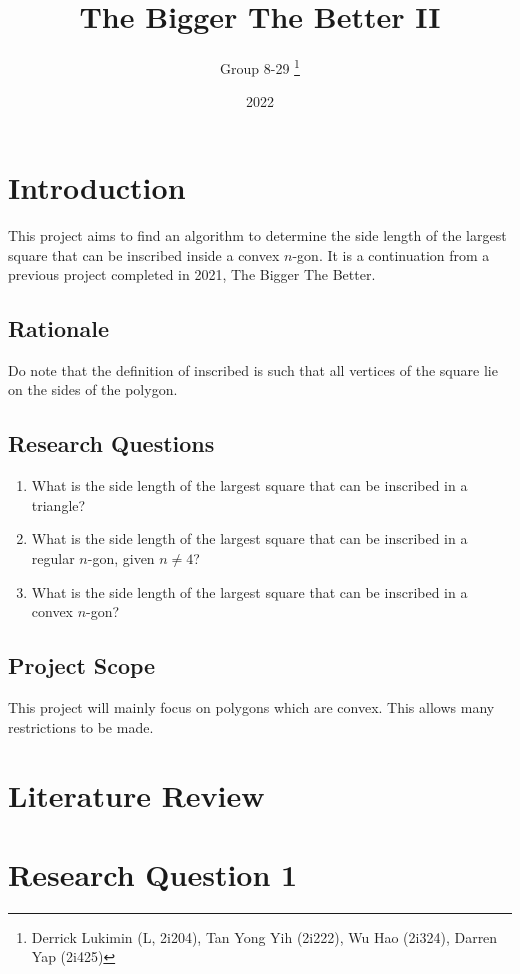 \documentclass[12pt]{scrartcl}
\title{The Bigger The Better II}
\author{Group 8-29 \thanks{Derrick Lukimin (L, 2i204), Tan Yong Yih (2i222), Wu Hao (2i324), Darren Yap (2i425)}}
\date{2022}
\begin{document}
\doublespacing
\maketitle
\tableofcontents

\section{Introduction}
This project aims to find an algorithm to determine
the side length of the largest square that can be
inscribed inside a convex $n$-gon. It is a continuation from
a previous project completed in 2021, The Bigger The Better. \cite{tbtb1}

\subsection{Rationale}
Do note that the definition of inscribed is such that all vertices of the square lie on the sides of the polygon.

\subsection{Research Questions}
\begin{enumerate}
	\item What is the side length of the largest square that can be inscribed in a triangle?
	\item What is the side length of the largest square that can be inscribed in a regular $n$-gon, given $n \neq 4$?
	\item What is the side length of the largest square that can be inscribed in a convex $n$-gon?
\end{enumerate}

\subsection{Project Scope}
This project will mainly focus on polygons which are convex. This allows many restrictions to be made.

\section{Literature Review}

\section{Research Question 1}
\end{document}
